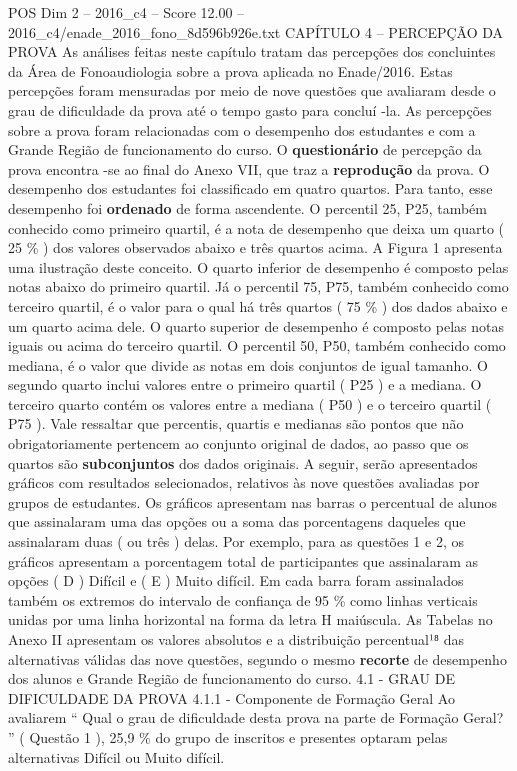 \begin{textsample}{POS Dim 2 – 2016\_c4 – Score 12.00 – 2016\_c4/enade\_2016\_fono\_8d596b926e.txt}  \label{ex:f2_pos_073}
CAPÍTULO 4 – PERCEPÇÃO DA PROVA As análises feitas neste capítulo tratam das percepções dos concluintes da Área de Fonoaudiologia sobre a prova aplicada no Enade/2016.
Estas percepções foram mensuradas por meio de nove questões que avaliaram desde o grau de dificuldade da prova até o tempo gasto para concluí -la.
As percepções sobre a prova foram relacionadas com o desempenho dos estudantes e com a Grande Região de funcionamento do curso.
O \textbf{questionário} de percepção da prova encontra -se ao final do Anexo VII, que traz a \textbf{reprodução} da prova.
O desempenho dos estudantes foi classificado em quatro quartos.
Para tanto, esse desempenho foi \textbf{ordenado} de forma ascendente.
O percentil 25, P25, também conhecido como primeiro quartil, é a nota de desempenho que deixa um quarto ( 25 \% ) dos valores observados abaixo e três quartos acima.
A Figura 1 apresenta uma ilustração deste conceito.
O quarto inferior de desempenho é composto pelas notas abaixo do primeiro quartil.
Já o percentil 75, P75, também conhecido como terceiro quartil, é o valor para o qual há três quartos ( 75 \% ) dos dados abaixo e um quarto acima dele.
O quarto superior de desempenho é composto pelas notas iguais ou acima do terceiro quartil.
O percentil 50, P50, também conhecido como mediana, é o valor que divide as notas em dois conjuntos de igual tamanho.
O segundo quarto inclui valores entre o primeiro quartil ( P25 ) e a mediana.
O terceiro quarto contém os valores entre a mediana ( P50 ) e o terceiro quartil ( P75 ).
Vale ressaltar que percentis, quartis e medianas são pontos que não obrigatoriamente pertencem ao conjunto original de dados, ao passo que os quartos são \textbf{subconjuntos} dos dados originais.
A seguir, serão apresentados gráficos com resultados selecionados, relativos às nove questões avaliadas por grupos de estudantes.
Os gráficos apresentam nas barras o percentual de alunos que assinalaram uma das opções ou a soma das porcentagens daqueles que assinalaram duas ( ou três ) delas.
Por exemplo, para as questões 1 e 2, os gráficos apresentam a porcentagem total de participantes que assinalaram as opções ( D ) Difícil e ( E ) Muito difícil.
Em cada barra foram assinalados também os extremos do intervalo de confiança de 95 \% como linhas verticais unidas por uma linha horizontal na forma da letra H maiúscula.
As Tabelas no Anexo II apresentam os valores absolutos e a distribuição percentual¹⁸ das alternativas válidas das nove questões, segundo o mesmo \textbf{recorte} de desempenho dos alunos e Grande Região de funcionamento do curso. 4.1 - GRAU DE DIFICULDADE DA PROVA 4.1.1 - Componente de Formação Geral Ao avaliarem “ Qual o grau de dificuldade desta prova na parte de Formação Geral? ” ( Questão 1 ), 25,9 \% do grupo de inscritos e presentes optaram pelas alternativas Difícil ou Muito difícil.

\end{textsample}
